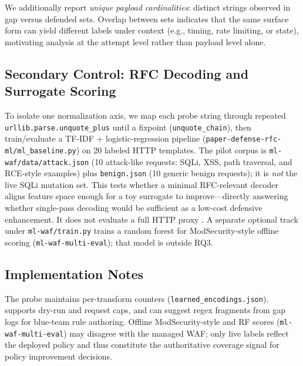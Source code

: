 We additionally report \emph{unique payload cardinalities}: distinct strings observed in gap versus defended sets. Overlap between sets indicates that the same surface form can yield different labels under context (e.g., timing, rate limiting, or state), motivating analysis at the attempt level rather than payload level alone.

\subsection{Secondary Control: RFC Decoding and Surrogate Scoring}
To isolate one normalization axis, we map each probe string through repeated \texttt{urllib.parse.unquote\_plus} until a fixpoint (\texttt{unquote\_chain}), then train/evaluate a TF-IDF + logistic-regression pipeline (\texttt{paper-defense-rfc-ml/ml\_baseline.py}) on 20 labeled HTTP templates. The pilot corpus is \texttt{ml-waf/data/attack.json} (10 attack-like requests: SQLi, XSS, path traversal, and RCE-style examples) plus \texttt{benign.json} (10 generic benign requests); it is \emph{not} the live SQLi mutation set. This tests whether a minimal RFC-relevant decoder aligns feature space enough for a toy surrogate to improve---directly answering whether single-pass decoding would be sufficient as a low-cost defensive enhancement. It does not evaluate a full HTTP proxy \cite{httpnormalizer,rfc7230,rfc3986}. A separate optional track under \texttt{ml-waf/train.py} trains a random forest for ModSecurity-style offline scoring (\texttt{ml-waf-multi-eval}); that model is outside RQ3.

\subsection{Implementation Notes}
The probe maintains per-transform counters (\texttt{learned\_encodings.json}), supports dry-run and request caps, and can suggest regex fragments from gap logs for blue-team rule authoring. Offline ModSecurity-style and RF scores (\texttt{ml-waf-multi-eval}) may disagree with the managed WAF; only live labels reflect the deployed policy and thus constitute the authoritative coverage signal for policy improvement decisions.
